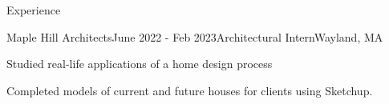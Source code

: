 \documentclass[
	a4paper, %
	9pt, %
]{resume} %
\begin{document}
\begin{rSection}{Experience}
%	




	\begin{rSubsection}{Maple Hill Architects}{June 2022 - Feb 2023}{Architectural Intern}{Wayland, MA}
		\item Studied real-life applications of a home design process
		\item Completed models of current and future houses for clients using Sketchup.
	\end{rSubsection}
\end{rSection}
\end{document}
